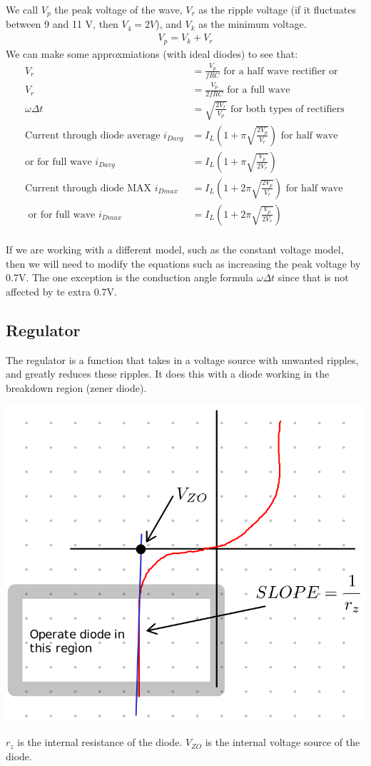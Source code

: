 \documentclass[12pt,letterpaper]{article} \usepackage{amsmath} \usepackage{graphicx} \usepackage[margin=1in]{geometry} \usepackage{longtable}  \usepackage{amssymb}
\begin{document}
	We call $V_p$ the peak voltage of the wave, $V_r$ as the ripple voltage (if it fluctuates between 9 and 11 V, then $V_4=2V$), and $V_k$ as the minimum voltage.
	\begin{align*}
		V_p = V_k + V_r
	\end{align*}
	We can make some approxmiations (with ideal diodes) to see that:
	\begin{align*}
		V_r &= \frac{V_p}{fRC} \text{ for a half wave rectifier or } \\
		V_r &= \frac{V_p}{2fRC} \text{ for a full wave }\\
		\omega\Delta t &= \sqrt{\frac{2V_r}{V_p}} \text{ for both types of rectifiers}\\
		\text{Current through diode average }i_{Davg} &= I_L(1+\pi\sqrt{\frac{2V_p}{V_r}}) \text { for half wave} \\ 
		\text{or for full wave } i_{Davg} &= I_L (1+\pi\sqrt{\frac{V_p}{2V_r}}) \\
		\text{Current through diode MAX }i_{Dmax} &= I_L(1+2\pi\sqrt{\frac{2V_p}{V_r}}) \text{ for half wave }\\ 
		\text { or for full wave } i_{Dmax} &= I_L (1+2\pi\sqrt{\frac{V_p}{2V_r}}) \\
	\end{align*}

	If we are working with a different model, such as the constant voltage model, then we will need to modify the equations such as increasing the peak voltage by 0.7V. The one exception is the conduction angle formula $\omega \Delta t$ since that is not affected by te extra 0.7V.
	
	
	\subsection{Regulator}
	The regulator is a function that takes in a voltage source with unwanted ripples, and greatly reduces these ripples. It does this with a diode working in the breakdown region (zener diode).
	\begin{center}
		\includegraphics[width=0.4\linewidth]{regulator}
	\end{center}
	$r_z$ is the internal resistance of the diode. $V_{ZO}$ is the internal voltage source of the diode. 
	
\end{document}
